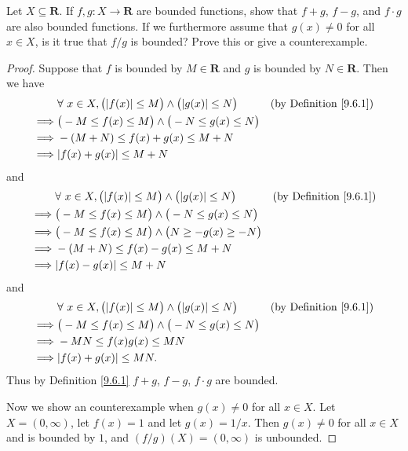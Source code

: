 \begin{exercise}\label{ex 9.6.2}
    Let \(X \subseteq \mathbf{R}\).
    If \(f, g: X \to \mathbf{R}\) are bounded functions, show that \(f + g\), \(f - g\), and \(f \cdot g\) are also bounded functions.
    If we furthermore assume that \(g(x) \neq 0\) for all \(x \in X\), is it true that \(f / g\) is bounded?
    Prove this or give a counterexample.
\end{exercise}

\begin{proof}
    Suppose that \(f\) is bounded by \(M \in \mathbf{R}\) and \(g\) is bounded by \(N \in \mathbf{R}\).
    Then we have
    \begin{align*}
                 & \forall\ x \in X, \big(\abs*{f(x)} \leq M\big) \land \big(\abs*{g(x)} \leq N\big) & \text{(by Definition \ref{9.6.1})} \\
        \implies & \big(-M \leq f(x) \leq M\big) \land \big(-N \leq g(x) \leq N\big)                                                      \\
        \implies & -(M + N) \leq f(x) + g(x) \leq M + N                                                                                   \\
        \implies & \abs*{f(x) + g(x)} \leq M + N
    \end{align*}
    and
    \begin{align*}
                 & \forall\ x \in X, \big(\abs*{f(x)} \leq M\big) \land \big(\abs*{g(x)} \leq N\big) & \text{(by Definition \ref{9.6.1})} \\
        \implies & \big(-M \leq f(x) \leq M\big) \land \big(-N \leq g(x) \leq N\big)                                                      \\
        \implies & \big(-M \leq f(x) \leq M\big) \land \big(N \geq -g(x) \geq -N\big)                                                     \\
        \implies & -(M + N) \leq f(x) - g(x) \leq M + N                                                                                   \\
        \implies & \abs*{f(x) - g(x)} \leq M + N
    \end{align*}
    and
    \begin{align*}
                 & \forall\ x \in X, \big(\abs*{f(x)} \leq M\big) \land \big(\abs*{g(x)} \leq N\big) & \text{(by Definition \ref{9.6.1})} \\
        \implies & \big(-M \leq f(x) \leq M\big) \land \big(-N \leq g(x) \leq N\big)                                                      \\
        \implies & -MN \leq f(x) g(x) \leq MN                                                                                             \\
        \implies & \abs*{f(x) + g(x)} \leq MN.
    \end{align*}
    Thus by Definition \ref{9.6.1} \(f + g\), \(f - g\), \(f \cdot g\) are bounded.

    Now we show an counterexample when \(g(x) \neq 0\) for all \(x \in X\).
    Let \(X = (0, \infty)\), let \(f(x) = 1\) and let \(g(x) = 1 / x\).
    Then \(g(x) \neq 0\) for all \(x \in X\) and is bounded by \(1\), and \((f / g)(X) = (0, \infty)\) is unbounded.
\end{proof}